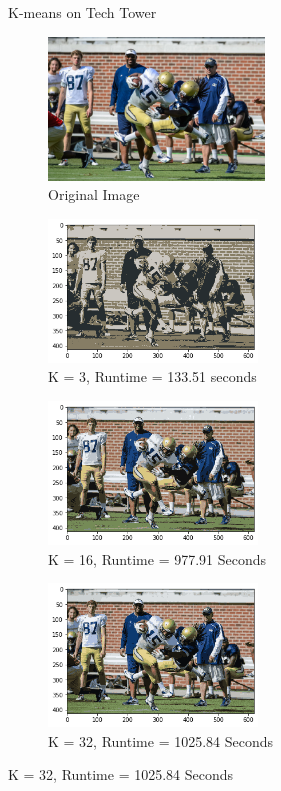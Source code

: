 \documentclass[twoside,10pt]{article}
\begin{document}
\begin{enumerate}
\begin{itemize}
\begin{figure}
\caption{K-means on Tech Tower}
\label{fig:fig}
\end{figure}  
  
\begin{figure}
    \begin{subfigure}{.5\textwidth}
  \centering
  \includegraphics[height=1.5in]{Images/football.png}  
  \caption{Original Image}
  \label{fig:sub-first}
\end{subfigure}
\begin{subfigure}{.5\textwidth}
  \centering
  \includegraphics[height=1.5in]{Images/footballkmeans3.png}  
  \caption{K = 3, Runtime = 133.51 seconds}
  \label{fig:sub-first}
\end{subfigure}
\begin{subfigure}{.5\textwidth}
  \centering
  \includegraphics[height=1.5in]{Images/footballkmeans16.png}  
  \caption{K = 16, Runtime = 977.91 Seconds}
  \label{fig:sub-second}
\end{subfigure}
\begin{subfigure}{.5\textwidth}
  \centering
  \includegraphics[height=1.5in]{Images/footballkmeans32.png}  
  \caption{K = 32, Runtime = 1025.84 Seconds}
  \label{fig:sub-third}
\end{subfigure}


\end{figure}
\end{itemize}
\end{enumerate}
\end{document}
